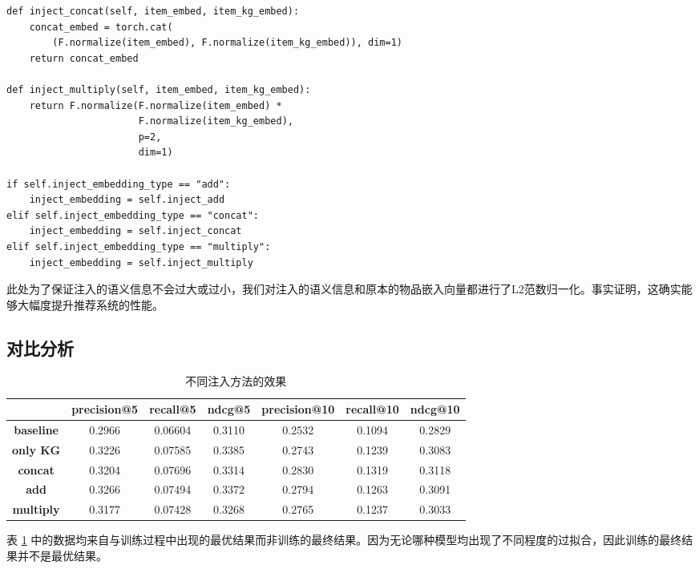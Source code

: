 \documentclass{ctexart}
\begin{document}
\begin{sloppypar}
\begin{enumerate}
\begin{lstlisting}[style=python]
def inject_concat(self, item_embed, item_kg_embed):
    concat_embed = torch.cat(
        (F.normalize(item_embed), F.normalize(item_kg_embed)), dim=1)
    return concat_embed

def inject_multiply(self, item_embed, item_kg_embed):
    return F.normalize(F.normalize(item_embed) *
                       F.normalize(item_kg_embed),
                       p=2,
                       dim=1)

if self.inject_embedding_type == "add":
    inject_embedding = self.inject_add
elif self.inject_embedding_type == "concat":
    inject_embedding = self.inject_concat
elif self.inject_embedding_type == "multiply":
    inject_embedding = self.inject_multiply

    \end{lstlisting}

    此处为了保证注入的语义信息不会过大或过小，我们对注入的语义信息和原本的物品嵌入向量都进行了L2范数归一化。事实证明，这确实能够大幅度提升推荐系统的性能。
    \end{enumerate}

    \subsection{对比分析}
    \begin{table}[h]
        \centering
        \caption{不同注入方法的效果\label{tab:3}}
            \begin{tabular}{ccccccc}
                \toprule
                                  & \textbf{precision@5} & \textbf{recall@5} & \textbf{ndcg@5} & \textbf{precision@10} & \textbf{recall@10} & \textbf{ndcg@10} \\\midrule
                \textbf{baseline} & 0.2966               & 0.06604           & 0.3110          & 0.2532                & 0.1094             & 0.2829           \\
                \textbf{only KG}  & 0.3226               & 0.07585           & 0.3385          & 0.2743                & 0.1239             & 0.3083           \\
                \textbf{concat}   & 0.3204               & 0.07696           & 0.3314          & 0.2830                & 0.1319             & 0.3118           \\
                \textbf{add}      & 0.3266               & 0.07494           & 0.3372          & 0.2794                & 0.1263             & 0.3091           \\
                \textbf{multiply} & 0.3177               & 0.07428           & 0.3268          & 0.2765                & 0.1237             & 0.3033           \\
                \bottomrule
            \end{tabular}
    \end{table}
表 \ref{tab:3} 中的数据均来自与训练过程中出现的最优结果而非训练的最终结果。因为无论哪种模型均出现了不同程度的过拟合，因此训练的最终结果并不是最优结果。


\end{sloppypar}
\end{document}
